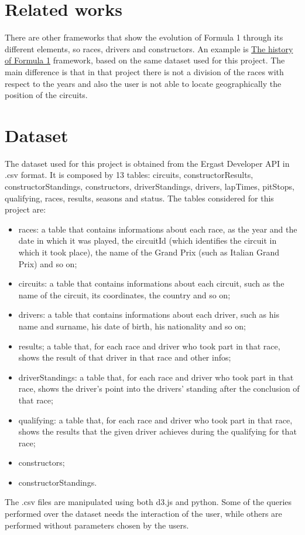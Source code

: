 \documentclass[10pt,twocolumn,letterpaper]{article}
\begin{document}
\section{Related works}
There are other frameworks that show the evolution of Formula 1 through its different elements, so races, drivers and constructors. An example is
\href{https://f1.bitmetric.nl/formula.html}{The history of Formula 1} framework, based on the same dataset used for this project. The main difference is that in that project
there is not a division of the races with respect to the years and also the user is not able to locate geographically the position of the circuits. 

\section{Dataset}
The dataset used for this project is obtained from the Ergast Developer API \cite{Dataset} in .csv format. It is composed by 13 tables: circuits,
constructorResults, constructorStandings, constructors, driverStandings, drivers, lapTimes, pitStops, qualifying, races, results, seasons and status. The tables considered
for this project are:
\begin{itemize}
	\item races: a table that contains informations about each race, as the year and the date in which it was played, the circuitId (which identifies the circuit in which it took place), the name of the Grand Prix (such as Italian Grand Prix) and so on;
	\item circuits: a table that contains informations about each circuit, such as the name of the circuit, its coordinates, the country and so on;
	\item drivers: a table that contains informations about each driver, such as his name and surname, his date of birth, his nationality and so on;
	\item results; a table that, for each race and driver who took part in that race, shows the result of that driver in that race and other infos;
	\item driverStandings: a table that, for each race and driver who took part in that race, shows the driver's point into the drivers' standing after the conclusion of that
	race;
	\item qualifying: a table that, for each race and driver who took part in that race, shows the results that the given driver achieves during the qualifying for that race;
	\item constructors;
	\item constructorStandings. 
\end{itemize}
The .csv files are manipulated using both d3.js and python. Some of the queries performed over the dataset needs the interaction of the user, while others are performed
without parameters chosen by the users.
\end{document}
